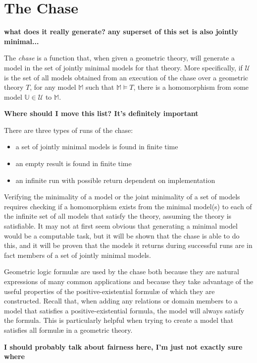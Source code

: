 \section{The Chase}
\label{sec:chase}

	\textbf{ what does it really generate? any superset of this set is also jointly minimal... }

	The \emph{chase} is a function that, when given a geometric theory, will
	generate a model in the set of jointly minimal models for that theory. More
	specifically, if $\mathcal{U}$ is the set of all models obtained from an
	execution of the chase over a geometric theory $T$, for any model
	$\mathbb{M}$ such that $\mathbb{M} \models T$, there is a homomorphism from
	some model $\mathbb{U} \in \mathcal{U}$ to $\mathbb{M}$.

	\textbf{ Where should I move this list? It's definitely important }

	There are three types of runs of the chase:
	\begin{itemize}
	\item a set of jointly minimal models is found in finite time
	\item an empty result is found in finite time
	\item an infinite run with possible return dependent on implementation
	\end{itemize}

	Verifying the minimality of a model or the joint minimality of a set of
	models requires checking if a homomorphism exists from the minimal model(s)
	to each of the infinite set of all models that satisfy the theory, assuming
	the theory is satisfiable. It may not at first seem obvious that generating
	a minimal model would be a computable task, but it will be shown that the
	chase is able to do this, and it will be proven that the models it returns
	during successful runs are in fact members of a set of jointly minimal
	models.

	Geometric logic formul{\ae} are used by the chase both because they are
	natural expressions of many common applications and because they take
	advantage of the useful properties of the positive-existential formul{\ae}
	of which they are constructed. Recall that, when adding any relations or
	domain members to a model that satisfies a positive-existential formula,
	the model will always satisfy the formula. This is particularly helpful
	when trying to create a model that satisfies all formul{\ae} in a geometric
	theory.

	\textbf{ I should probably talk about fairness here, I'm just not exactly sure where }

